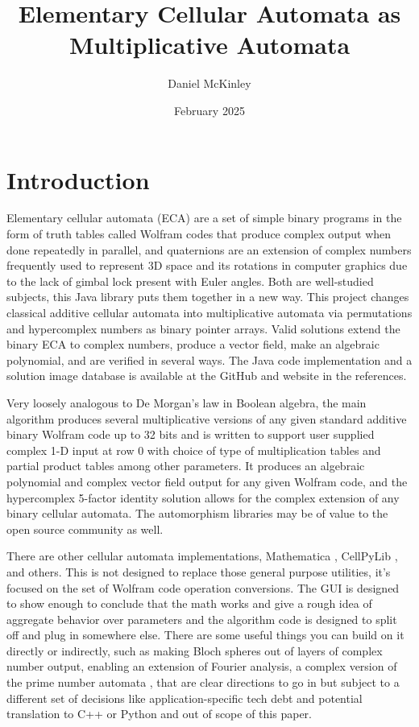 \documentclass[11pt]{article}
\title{Elementary Cellular Automata as Multiplicative Automata}
\date{February 2025}
\author{Daniel McKinley}
\begin{document}
\maketitle


\section{Introduction}

Elementary cellular automata (ECA) are a set of simple binary programs in the form of truth tables called Wolfram codes that produce complex output when done repeatedly in parallel, and quaternions are an extension of complex numbers frequently used to represent 3D space and its rotations in computer graphics due to the lack of gimbal lock present with Euler angles. Both are well-studied subjects, this Java library puts them together in a new way. This project changes classical additive cellular automata into multiplicative automata \cite{Wolfram} via permutations and hypercomplex numbers as binary pointer arrays. Valid solutions extend the binary ECA to complex numbers, produce a vector field, make an algebraic polynomial, and are verified in several ways. The Java code implementation \cite{mygit} and a solution image database \cite{dmwebsite} is available at the GitHub and website in the references.

Very loosely analogous to De Morgan's law in Boolean algebra, the main algorithm produces several multiplicative versions of any given standard additive binary Wolfram code up to 32 bits and is written to support user supplied complex 1-D input at row 0 with choice of type of multiplication tables and partial product tables among other parameters. It produces an algebraic polynomial and complex vector field output for any given Wolfram code, and the hypercomplex 5-factor identity solution allows for the complex extension of any binary cellular automata.  The automorphism libraries may be of value to the open source community as well. 

There are other cellular automata implementations, Mathematica \cite{Mathematica}, CellPyLib \cite{Antunes2021}, and others. This is not designed to replace those general purpose utilities, it's focused on the set of Wolfram code operation conversions. The GUI is designed to show enough to conclude that the math works and give a rough idea of aggregate behavior over parameters and the algorithm code is designed to split off and plug in somewhere else. There are some useful things you can build on it directly or indirectly, such as making Bloch spheres out of layers of complex number output, enabling an extension of Fourier analysis, a complex version of the prime number automata \cite{Wolfram}, that are clear directions to go in but subject to a different set of decisions like application-specific tech debt and potential translation to C++ or Python and out of scope of this paper.
\end{document}
